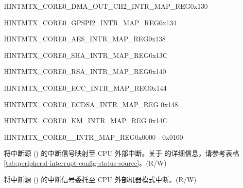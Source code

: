 \begin{register}{H}{INTMTX\_CORE0\_DMA\_OUT\_CH2\_INTR\_MAP\_REG}{0x130}\label{regdesc:INTMTXCORE0DMAOUTCH2INTRMAPREG} \end{register}\vspace{-3em}
\begin{register}{H}{INTMTX\_CORE0\_GPSPI2\_INTR\_MAP\_REG}{0x134}\label{regdesc:INTMTXCORE0GPSPI2INTRMAPREG} \end{register}\vspace{-3em}
\begin{register}{H}{INTMTX\_CORE0\_AES\_INTR\_MAP\_REG}{0x138}\label{regdesc:INTMTXCORE0AESINTRMAPREG} \end{register}\vspace{-3em}
\begin{register}{H}{INTMTX\_CORE0\_SHA\_INTR\_MAP\_REG}{0x13C}\label{regdesc:INTMTXCORE0SHAINTRMAPREG} \end{register}\vspace{-3em}
\begin{register}{H}{INTMTX\_CORE0\_RSA\_INTR\_MAP\_REG}{0x140}\label{regdesc:INTMTXCORE0RSAINTRMAPREG} \end{register}\vspace{-3em}
\begin{register}{H}{INTMTX\_CORE0\_ECC\_INTR\_MAP\_REG}{0x144}\label{regdesc:INTMTXCORE0ECCINTRMAPREG} \end{register}\vspace{-3em}
\begin{register}{H}{INTMTX\_CORE0\_ECDSA\_INTR\_MAP\_REG}
{0x148}\label{regdesc:INTMTXCORE0ECDSAINTRMAPREG} \end{register}\vspace{-3em}
\begin{register}{H}{INTMTX\_CORE0\_KM\_INTR\_MAP\_REG}
{0x14C}\label{regdesc:INTMTXCORE0KMINTRMAPREG} \end{register}\vspace{-3em}



\begin{register}{H}{INTMTX\_CORE0\_\_INTR\_MAP\_REG}{0x0000 - 0x0100}\label{INTMTXCORE0SOURCEINTRMAPREG}
%
%
%
%
\regnewline%
\begin{regdesc}\begin{reglist}
\label{INTMTXCORE0SOURCEINTRMAP}\item [INTMTX\_CORE0\_\regindex{SOURCE}\_INTR\_MAP]
将中断源 () 的中断信号映射至 CPU 外部中断。关于  的详细信息，请参考表格 \ref{tab:peripheral-interrupt-config-status-source}。(R/W)
\label{INTMTXCORE0SOURCEINTRPASSINSEC}\item
[INTMTX\_CORE0\_\regindex{SOURCE}\_INTR\_PASS\_IN\_SEC]
将中断源 () 的中断信号委托至 CPU 外部机器模式中断。(R/W)
\end{reglist}\end{regdesc}
\end{register}


